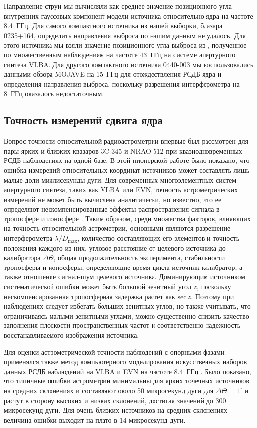 Направление струи мы вычисляли как среднее значение позиционного угла внутренних гауссовых компонент
модели источника относительно ядра на частоте 8.4~ГГц. Для самого компактного источника из нашей
выборки, блазара 0235+164, определить направления выброса по нашим данным не удалось. Для этого
источника мы взяли значение позиционного угла выброса из \cite{Kutkin_2018}, полученное по
множественным наблюдениям на частоте 43~ГГц на системе апертурного синтеза VLBA. Для другого
компактного источника 0440-003 мы воспользовались данными обзора MOJAVE на 15~ГГц
\cite{Lister_2016,Hovatta_2014} для отождествления РСДБ-ядра и определения направления выброса,
поскольку разрешения интерферометра на 8~ГГц оказалось недостаточным.


\subsection{Точность измерений сдвига ядра}
\label{s:errors}
Вопрос точности относительной радиоастрометрии впервые был рассмотрен \cite{Shapiro79} для пары
ярких и близких квазаров 3C 345 и NRAO 512 при квазиодновременных РСДБ наблюдениях на одной базе.
В этой пионерской работе было показано, что ошибка измерений относительных координат источников
может составлять лишь малые доли миллисекунды дуги. Для современных многоэлементных систем
апертурного синтеза, таких как VLBA или EVN, точность астрометрических измерений не может быть
вычислена аналитически, но известно, что ее определяют нескомпенсированные эффекты распространения
сигнала в тропосфере и ионосфере \cite{Reid14}. Таким образом, среди множества факторов, влияющих
на точность относительной астрометрии, основными являются разрешение интерферометра
$\lambda/D_\textrm{max}$, количество составляющих его элементов и точность положения каждого из них,
угловое расстояние от целевого источника до калибратора $\Delta\Theta$, общая продолжительность
эксперимента, стабильности тропосферы и ионосферы, определяющие время цикла источник-калибратор, а
также отношение сигнал-шум целевого источника. Доминирующим источником систематической ошибки может
быть большой зенитный угол $z$, поскольку нескомпенсированная тропосферная задержка растет как
$\textrm{sec}\,z$. Поэтому при наблюдениях следует избегать больших зенитных углов, но также
учитывать, что ограничиваясь малыми зенитными углами, можно существенно снизить качество заполнения
плоскости пространственных частот и соответственно надежность восстанавливаемого изображения
источника.

Для оценки астрометрической точности наблюдений с опорными фазами применялся также метод
компьютерного моделирования искусственных наборов данных РСДБ наблюдений на VLBA и EVN
на частоте 8.4~ГГц \cite{Pradel06}. Было показано, что типичные ошибки астрометрии минимальны
для ярких точечных источников на средних склонениях и составляют около 50 микросекунд дуги для
$\Delta\Theta=1^\circ$ и растут в сторону высоких и низких склонений, достигая значений до 300
микросекунд дуги. Для очень близких источников на средних склонениях величина ошибки выходит на
плато в 14 микросекунд дуги.

